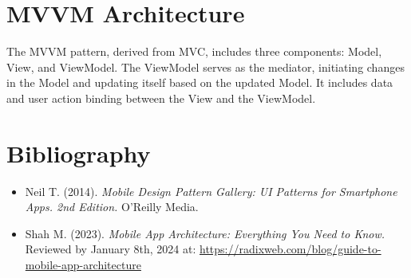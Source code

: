\documentclass{article}
\begin{document}
	\section*{MVVM Architecture}
	The MVVM pattern, derived from MVC, includes three components: Model, View, and ViewModel. The ViewModel serves as the mediator, initiating changes in the Model and updating itself based on the updated Model. It includes data and user action binding between the View and the ViewModel.
	
	\section*{Bibliography}
	\begin{itemize}
		\item Neil T. (2014). \textit{Mobile Design Pattern Gallery: UI Patterns for Smartphone Apps. 2nd Edition.} O'Reilly Media.
		\item Shah M. (2023). \textit{Mobile App Architecture: Everything You Need to Know.} Reviewed by January 8th, 2024 at: \url{https://radixweb.com/blog/guide-to-mobile-app-architecture}
	\end{itemize}
	
\end{document}
